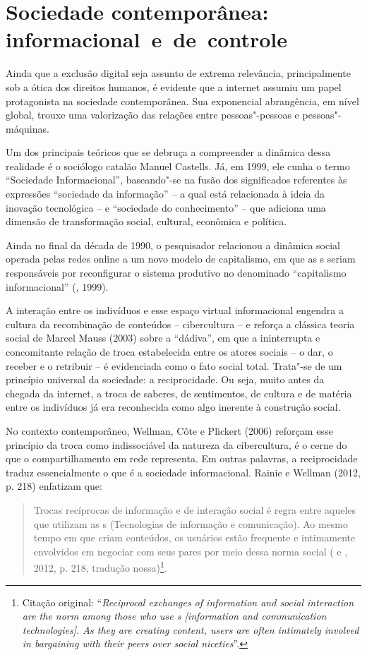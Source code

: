 \section{Sociedade contemporânea: informacional~e~de~controle}

Ainda que a exclusão digital seja assunto de extrema relevância,
principalmente sob a ótica dos direitos humanos, é evidente que a
internet assumiu um papel protagonista na sociedade contemporânea. Sua
exponencial abrangência, em nível global, trouxe uma valorização das
relações entre pessoas"-pessoas e pessoas"-máquinas.

Um dos principais teóricos que se debruça a compreender a dinâmica dessa
realidade é o sociólogo catalão Manuel Castells. Já, em 1999, ele cunha
o termo ``Sociedade Informacional'', baseando"-se na fusão dos
significados referentes às expressões ``sociedade da informação'' -- a
qual está relacionada à ideia da inovação tecnológica -- e ``sociedade do
conhecimento'' -- que adiciona uma dimensão de transformação social,
cultural, econômica e política.

Ainda no final da década de 1990, o pesquisador relacionou a dinâmica
social operada pelas redes online a um novo modelo de capitalismo, em
que as s seriam responsáveis por reconfigurar o sistema produtivo no
denominado ``capitalismo informacional'' (, 1999).

A interação entre os indivíduos e esse espaço virtual informacional
engendra a cultura da recombinação de conteúdos -- cibercultura -- e
reforça a clássica teoria social de Marcel Mauss (2003) sobre a
``dádiva'', em que a ininterrupta e concomitante relação de troca
estabelecida entre os atores sociais -- o dar, o receber e o retribuir
-- é evidenciada como o fato social total. Trata"-se de um princípio
universal da sociedade: a reciprocidade. Ou seja, muito antes da chegada
da internet, a troca de saberes, de sentimentos, de cultura e de matéria
entre os indivíduos já era reconhecida como algo inerente à construção
social.

No contexto contemporâneo, Wellman, Côte e Plickert (2006) reforçam esse
princípio da troca como indissociável da natureza da cibercultura, é o
cerne do que o compartilhamento em rede representa. Em outras palavras,
a reciprocidade traduz essencialmente o que é a sociedade informacional.
Rainie e Wellman (2012, p. 218) enfatizam que:

\begin{quote}
Trocas recíprocas de informação e de interação social é regra entre
aqueles que utilizam as s (Tecnologias de informação e comunicação).
Ao mesmo tempo em que criam conteúdos, os usuários estão frequente e
intimamente envolvidos em negociar com seus pares por meio dessa norma
social ( e , 2012, p. 218, tradução nossa)\footnote{Citação
  original: ``\emph{Reciprocal exchanges of information and social interaction
        are the norm among those who use s {[}information and communication
        technologies{]}. As they are creating content, users are often
        intimately involved in bargaining with their peers over social
        niceties}''.}.
\end{quote}

